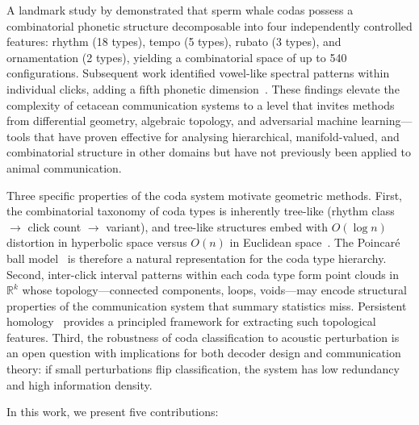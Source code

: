 \documentclass[11pt,a4paper]{article}
\begin{document}
A landmark study by \citet{Sharma2024} demonstrated that sperm whale
codas possess a combinatorial phonetic structure decomposable into four
independently controlled features: rhythm (18 types), tempo (5 types),
rubato (3 types), and ornamentation (2 types), yielding a combinatorial
space of up to 540 configurations. Subsequent work identified
vowel-like spectral patterns within individual clicks, adding a fifth
phonetic dimension~\citep{Begus2025}. These findings elevate the
complexity of cetacean communication systems to a level that invites
methods from differential geometry, algebraic topology, and adversarial
machine learning---tools that have proven effective for analysing
hierarchical, manifold-valued, and combinatorial structure in other
domains but have not previously been applied to animal communication.

Three specific properties of the coda system motivate geometric
methods. First, the combinatorial taxonomy of coda types is inherently
tree-like (rhythm class $\to$ click count $\to$ variant), and tree-like
structures embed with $O(\log n)$ distortion in hyperbolic space versus
$O(n)$ in Euclidean space~\citep{Sarkar2011}. The Poincar\'e ball
model~\citep{Nickel2017} is therefore a natural representation for the
coda type hierarchy. Second, inter-click interval patterns within each
coda type form point clouds in $\mathbb{R}^k$ whose topology---connected
components, loops, voids---may encode structural properties of the
communication system that summary statistics miss. Persistent
homology~\citep{Carlsson2009,Bauer2021} provides a principled framework
for extracting such topological features. Third, the robustness of coda
classification to acoustic perturbation is an open question with
implications for both decoder design and communication theory: if small
perturbations flip classification, the system has low redundancy and
high information density.

In this work, we present five contributions:
\end{document}
